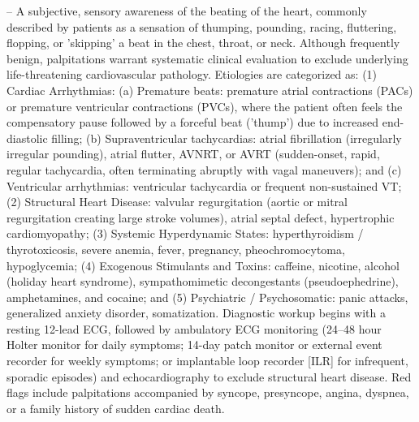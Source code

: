-- A subjective, sensory awareness of the beating of the heart, commonly described by patients as a sensation of thumping, pounding, racing, fluttering, flopping, or 'skipping' a beat in the chest, throat, or neck. Although frequently benign, palpitations warrant systematic clinical evaluation to exclude underlying life-threatening cardiovascular pathology. Etiologies are categorized as: (1) Cardiac Arrhythmias: (a) Premature beats: premature atrial contractions (PACs) or premature ventricular contractions (PVCs), where the patient often feels the compensatory pause followed by a forceful beat ('thump') due to increased end-diastolic filling; (b) Supraventricular tachycardias: atrial fibrillation (irregularly irregular pounding), atrial flutter, AVNRT, or AVRT (sudden-onset, rapid, regular tachycardia, often terminating abruptly with vagal maneuvers); and (c) Ventricular arrhythmias: ventricular tachycardia or frequent non-sustained VT; (2) Structural Heart Disease: valvular regurgitation (aortic or mitral regurgitation creating large stroke volumes), atrial septal defect, hypertrophic cardiomyopathy; (3) Systemic Hyperdynamic States: hyperthyroidism / thyrotoxicosis, severe anemia, fever, pregnancy, pheochromocytoma, hypoglycemia; (4) Exogenous Stimulants and Toxins: caffeine, nicotine, alcohol (holiday heart syndrome), sympathomimetic decongestants (pseudoephedrine), amphetamines, and cocaine; and (5) Psychiatric / Psychosomatic: panic attacks, generalized anxiety disorder, somatization. Diagnostic workup begins with a resting 12-lead ECG, followed by ambulatory ECG monitoring (24--48 hour Holter monitor for daily symptoms; 14-day patch monitor or external event recorder for weekly symptoms; or implantable loop recorder [ILR] for infrequent, sporadic episodes) and echocardiography to exclude structural heart disease. Red flags include palpitations accompanied by syncope, presyncope, angina, dyspnea, or a family history of sudden cardiac death.

